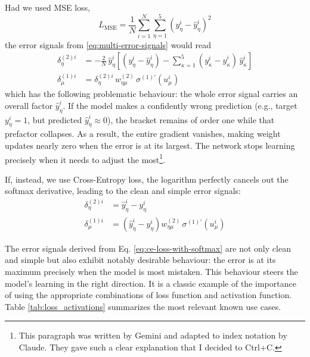 \documentclass[11pt,a4paper,oneside]{book}
\theoremstyle{definition}
\theoremstyle{plain}
\theoremstyle{remark}
\begin{document}
Had we used MSE loss,
\begin{equation}
    \label{eq:multi-mse-loss}
    L_\text{MSE} = \frac{1}{N}\sum_{i=1}^N\sum^5_{\eta=1}\left(y^i_\eta - \hat y^i_\eta\right)^2
\end{equation}
the error signals from \eqref{eq:multi-error-signals} would read
\begin{equation}
    \label{eq:mse-loss-with-softmax}
    \begin{split}
        \delta^{(2)i}_\eta &= -\frac{2}{N}\,\hat y^i_\eta\left[(y^i_\eta - \hat y^i_\eta) - \sum_{\kappa=1}^{5}(y^i_\kappa - \hat y^i_\kappa)\,\hat y^i_\kappa\right]\\[4pt]
        \delta^{(1)i}_\mu &= \delta^{(2)i}_\eta\,w^{(2)}_{\eta\mu}\,\sigma^{(1)\prime}(u^i_\mu)
    \end{split}
\end{equation}
which has the following problematic behaviour: the whole error signal carries an overall factor $\hat y^i_\eta$. If the model makes a confidently wrong prediction (e.g., target $y^i_\eta = 1$, but predicted $\hat{y}^i_\eta \approx 0$), the bracket remains of order one while that prefactor collapses. As a result, the entire gradient vanishes, making weight updates nearly zero when the error is at its largest. The network stops learning precisely when it needs to adjust the most\footnote{This paragraph was written by Gemini and adapted to index notation by Claude. They gave such a clear explanation that I decided to Ctrl+C.}.

If, instead, we use Cross-Entropy loss, the logarithm perfectly cancels out the softmax derivative, leading to the clean and simple error signals:
\begin{equation}
    \label{eq:ce-loss-with-softmax}
    \begin{split}
        \delta^{(2)i}_\eta &= \hat y^i_\eta - y^i_\eta\\[4pt]
        \delta^{(1)i}_\mu &= \left(\hat y^i_\eta - y^i_\eta\right)w^{(2)}_{\eta\mu}\,\sigma^{(1)\prime}(u^i_\mu)
    \end{split}
\end{equation}

The error signals derived from Eq. \eqref{eq:ce-loss-with-softmax} are not only clean and simple but also exhibit notably desirable behaviour: the error is at its maximum precisely when the model is most mistaken. This behaviour steers the model's learning in the right direction. It is a classic example of the importance of using the appropriate combinations of loss function and activation function. Table \ref{tab:loss_activations} summarizes the most relevant known use cases.
\end{document}
